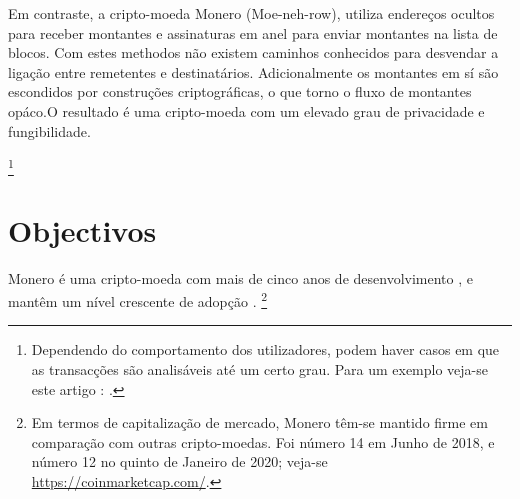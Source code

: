 Em contraste, a cripto-moeda Monero (Moe-neh-row), utiliza endereços ocultos para receber montantes e assinaturas em anel para enviar montantes na lista de blocos.  
Com estes methodos não existem caminhos conhecidos para desvendar a ligação entre remetentes e destinatários. Adicionalmente os montantes em sí são escondidos por construções criptográficas, o que torno o fluxo de montantes opáco.\newline O resultado é uma cripto-moeda com um elevado grau de privacidade e fungibilidade.

\footnote{Dependendo do comportamento dos utilizadores, podem haver casos em que as transacções são analisáveis até um certo grau. Para um exemplo veja-se este artigo : \cite{monero-ring-heuristics-ryo}.}




\section{Objectivos}
\label{sec:goals}
Monero é uma cripto-moeda com mais de cinco anos de desenvolvimento
\cite{bitmonero-launched, monero-history}, e mantêm um nível crescente de adopção
\cite{justin-defcon-2019-community-growth}.
\footnote{\label{marketcap_note} Em termos de capitalização de mercado, Monero têm-se mantido firme em comparação com outras cripto-moedas. Foi número 14 em Junho de 2018, e número 12 no quinto de Janeiro de 2020; veja-se \url{https://coinmarketcap.com/}.}

